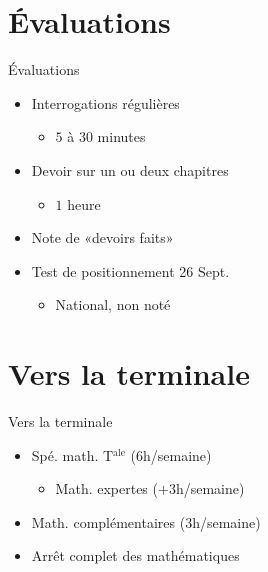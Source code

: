 \documentclass[17pt,xcolor=x11names]{beamer}
\begin{document}
\section*{Évaluations}
\begin{frame}{Évaluations}
  \begin{itemize}
    \item Interrogations régulières
      \begin{itemize}
        \item $5$ à $30$ minutes
      \end{itemize}
    \item Devoir sur un ou deux chapitres
      \begin{itemize}
        \item $1$ heure
      \end{itemize}
    \item Note de «devoirs faits»
    \item Test de positionnement 26 Sept.
      \begin{itemize}
        \item National, non noté
      \end{itemize}
  \end{itemize}
\end{frame}

\section*{Vers la terminale}
\begin{frame}{Vers la terminale}
      \begin{itemize}
        \item Spé. math. T$^\text{ale}$ ($6$h/semaine)
          \begin{itemize}
              \item Math. expertes ($+3$h/semaine)
          \end{itemize}
        \item Math. complémentaires ($3$h/semaine)
        \item Arrêt complet des mathématiques
  \end{itemize}
\end{frame}
\end{document}

